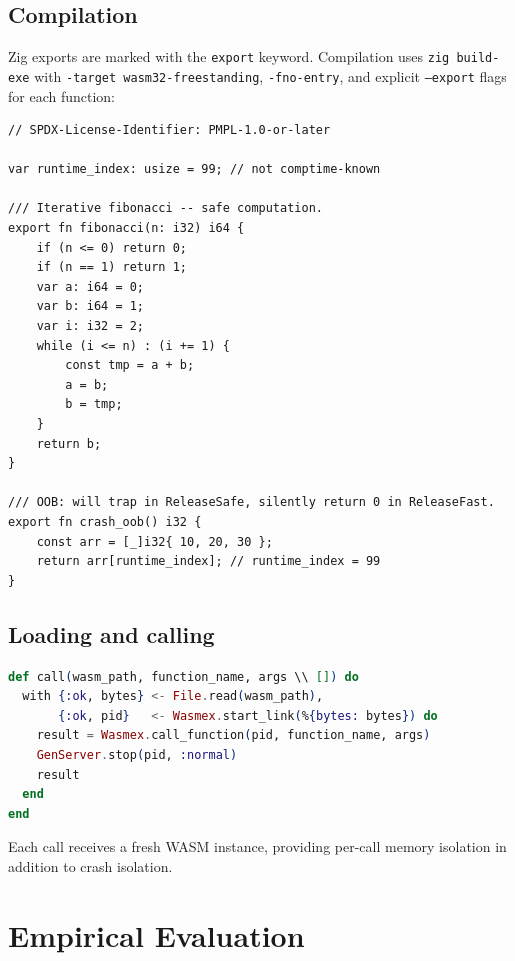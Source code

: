 \documentclass[11pt,a4paper]{article}
\begin{document}
\subsection{Compilation}

Zig exports are marked with the \texttt{export} keyword. Compilation uses
\texttt{zig build-exe} with \texttt{-target wasm32-freestanding},
\texttt{-fno-entry}, and explicit \texttt{--export} flags for each function:

\begin{lstlisting}[language=Zig, caption={Example SNIF function}]
// SPDX-License-Identifier: PMPL-1.0-or-later

var runtime_index: usize = 99; // not comptime-known

/// Iterative fibonacci -- safe computation.
export fn fibonacci(n: i32) i64 {
    if (n <= 0) return 0;
    if (n == 1) return 1;
    var a: i64 = 0;
    var b: i64 = 1;
    var i: i32 = 2;
    while (i <= n) : (i += 1) {
        const tmp = a + b;
        a = b;
        b = tmp;
    }
    return b;
}

/// OOB: will trap in ReleaseSafe, silently return 0 in ReleaseFast.
export fn crash_oob() i32 {
    const arr = [_]i32{ 10, 20, 30 };
    return arr[runtime_index]; // runtime_index = 99
}
\end{lstlisting}

\subsection{Loading and calling}

\begin{lstlisting}[language=Elixir, caption={SNIF loader (snif\_demo/loader.ex)}]
def call(wasm_path, function_name, args \\ []) do
  with {:ok, bytes} <- File.read(wasm_path),
       {:ok, pid}   <- Wasmex.start_link(%{bytes: bytes}) do
    result = Wasmex.call_function(pid, function_name, args)
    GenServer.stop(pid, :normal)
    result
  end
end
\end{lstlisting}

Each call receives a fresh WASM instance, providing per-call memory isolation
in addition to crash isolation.

\section{Empirical Evaluation}
\label{sec:evaluation}
\end{document}
